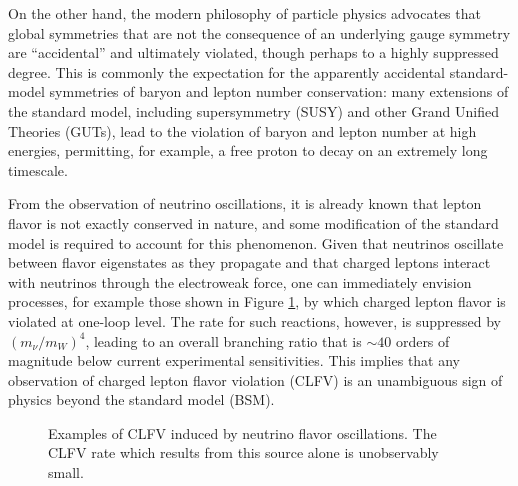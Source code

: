 \documentclass{book}[letterpaper,12pt]
\begin{document}
On the other hand, the modern philosophy of particle physics advocates that global symmetries that are not the consequence of an underlying gauge symmetry are ``accidental'' and ultimately violated, though perhaps to a highly suppressed degree. This is commonly the expectation for the apparently accidental standard-model symmetries of baryon and lepton number conservation: many extensions of the standard model, including supersymmetry (SUSY) and other Grand Unified Theories (GUTs), lead to the violation of baryon and lepton number at high energies, permitting, for example, a free proton to decay on an extremely long timescale. 

From the observation of neutrino oscillations, it is already known that lepton flavor is not exactly conserved in nature, and some modification of the standard model is required to account for this phenomenon. Given that neutrinos oscillate between flavor eigenstates as they propagate and that charged leptons interact with neutrinos through the electroweak force, one can immediately envision processes, for example those shown in Figure \ref{fig:neutrino_clfv}, by which charged lepton flavor is violated at one-loop level. The rate for such reactions, however, is suppressed by $(m_{\nu}/m_W)^4$, leading to an overall branching ratio that is $\sim 40$ orders of magnitude below current experimental sensitivities. This implies that any observation of charged lepton flavor violation (CLFV) is an unambiguous sign of physics beyond the standard model (BSM).

\begin{figure}
\centering
{}
\hspace{5cm}
\caption{Examples of CLFV induced by neutrino flavor oscillations. The CLFV rate which results from this source alone is unobservably small.}
\label{fig:neutrino_clfv}
\end{figure}
 
\end{document}
